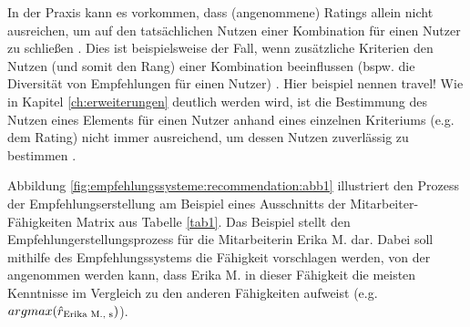 

In der Praxis kann es vorkommen, dass (angenommene) Ratings allein nicht ausreichen, um auf den tatsächlichen Nutzen einer Kombination für einen Nutzer zu schließen \cite[S. 896ff.]{adomavicius:article}.
Dies ist beispielsweise der Fall, wenn zusätzliche Kriterien den Nutzen (und somit den Rang) einer Kombination beeinflussen (bspw. die Diversität von Empfehlungen für einen Nutzer) \cite[S. 405]{unternährer:article}.
Hier beispiel nennen travel! %
Wie in Kapitel \ref{ch:erweiterungen} deutlich werden wird, ist die Bestimmung des Nutzen eines Elements für einen Nutzer anhand eines einzelnen Kriteriums (e.g. dem Rating) nicht immer ausreichend, um dessen Nutzen zuverlässig zu bestimmen \cite[S. 847]{adomavicius:4:inbook}.

Abbildung \ref{fig:empfehlungssysteme:recommendation:abb1} illustriert den Prozess der Empfehlungserstellung am Beispiel eines Ausschnitts der Mitarbeiter-Fähigkeiten Matrix aus Tabelle \ref{tab1}.
Das Beispiel stellt den Empfehlungerstellungsprozess für die Mitarbeiterin Erika M. dar.
Dabei soll mithilfe des Empfehlungssystems die Fähigkeit vorschlagen werden, von der angenommen werden kann, dass Erika M. in dieser Fähigkeit die meisten Kenntnisse im Vergleich zu den anderen Fähigkeiten aufweist (e.g. $argmax(\hat{r}_{\textnormal{Erika M., s}})$).

